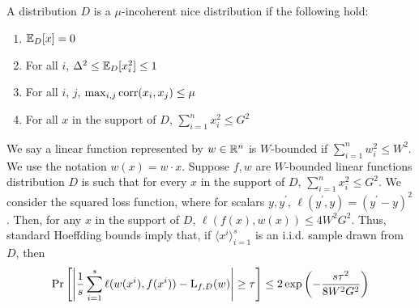 \begin{definition}
\label{defn:bhutan} A distribution $D$ is a $\mu$-incoherent nice distribution
if the following hold:
\begin{enumerate}
\item $\mathbb{E}_D[x] = 0$
\item For all $i$, $\Delta^2 \leq \mathbb{E}_D[x_i^2] \leq 1$
\item For all $i$, $j$, $\max_{i, j} \mathrm{corr}(x_i, x_j) \leq \mu$
\item For all $x$ in the support of $D$, $\sum_{i=1}^n x_i^2 \leq G^2$
\end{enumerate}
\end{definition}


We say a linear function represented by $w \in \mathbb{R}^n$ is $W$-bounded if
$\sum_{i=1}^n w_i^2 \leq W^2$. We use the notation $w(x) = w \cdot x$. Suppose
$f, w$ are $W$-bounded linear functions distribution $D$ is such that for every
$x$ in the support of $D$, $\sum_{i=1}^n x_i^2 \leq G^2$.  We consider the
squared loss function, where for scalars $y, y^\prime$, $\ell(y^\prime, y) =
(y^\prime - y)^2$.  Then, for any $x$ in the support of $D$, $\ell(f(x), w(x))
\leq 4 W^2G^2$. Thus, standard Hoeffding bounds imply that,
if $\langle x^i \rangle_{i=1}^s$ is an i.i.d. sample drawn from $D$, then
\[ 
\Pr\left[\left| \frac{1}{s} \sum_{i=1}^s \ell(w(x^i), f(x^i)) - \mathrm{L}_{f, D}(w)
\right| \geq \tau \right] \leq 2 \exp\left( -\frac{ s \tau^2}{8W^2G^2}\right)
\]



